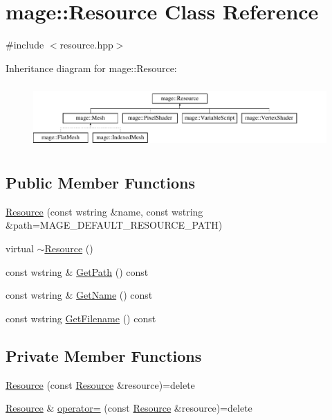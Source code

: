 \hypertarget{classmage_1_1_resource}{}\section{mage\+:\+:Resource Class Reference}
\label{classmage_1_1_resource}


{\ttfamily \#include $<$resource.\+hpp$>$}

Inheritance diagram for mage\+:\+:Resource\+:\begin{figure}[H]
\begin{center}
\leavevmode
\includegraphics[height=2.452555cm]{classmage_1_1_resource}
\end{center}
\end{figure}
\subsection*{Public Member Functions}
\begin{DoxyCompactItemize}
\item 
\hyperlink{classmage_1_1_resource_a37c7283a66b4658718465830072d6df6}{Resource} (const wstring \&name, const wstring \&path=M\+A\+G\+E\+\_\+\+D\+E\+F\+A\+U\+L\+T\+\_\+\+R\+E\+S\+O\+U\+R\+C\+E\+\_\+\+P\+A\+TH)
\item 
virtual \hyperlink{classmage_1_1_resource_a80112db991a7dfd1dc0b24967981ac60}{$\sim$\+Resource} ()
\item 
const wstring \& \hyperlink{classmage_1_1_resource_af1066ff99a6b3238de9702ddc971ffe0}{Get\+Path} () const
\item 
const wstring \& \hyperlink{classmage_1_1_resource_a49a7e0c571a266b0c3ddf20979c491c8}{Get\+Name} () const
\item 
const wstring \hyperlink{classmage_1_1_resource_a1f05385b8c05646989689fc04847a816}{Get\+Filename} () const
\end{DoxyCompactItemize}
\subsection*{Private Member Functions}
\begin{DoxyCompactItemize}
\item 
\hyperlink{classmage_1_1_resource_a4ee2dba2675546b603e03a69a2f2db52}{Resource} (const \hyperlink{classmage_1_1_resource}{Resource} \&resource)=delete
\item 
\hyperlink{classmage_1_1_resource}{Resource} \& \hyperlink{classmage_1_1_resource_ad8fa57f37eb253b90d18d33383b12875}{operator=} (const \hyperlink{classmage_1_1_resource}{Resource} \&resource)=delete
\end{DoxyCompactItemize}
